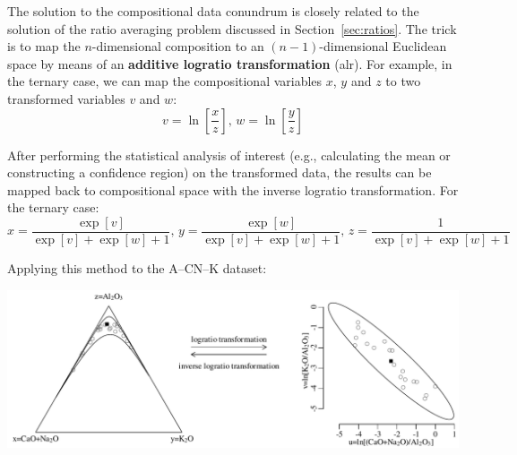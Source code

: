 The solution to the compositional data conundrum is closely related to
the solution of the ratio averaging problem discussed in
Section~\ref{sec:ratios}. The trick is to map the $n$-dimensional
composition to an $(n-1)$-dimensional Euclidean space by means of an
\textbf{additive logratio transformation} (alr). For example, in the
ternary case, we can map the compositional variables $x$, $y$ and $z$
to two transformed variables $v$ and $w$:
\begin{equation}
  v = \ln\!\left[\frac{x}{z}\right] \mbox{,~} w =
  \ln\!\left[\frac{y}{z}\right]
  \label{eq:alr}
\end{equation}

After performing the statistical analysis of interest (e.g.,
calculating the mean or constructing a confidence region) on the
transformed data, the results can be mapped back to compositional
space with the inverse logratio transformation. For the ternary case:
\begin{equation}
  x = \frac{\exp[v]}{\exp[v] + \exp[w] + 1} \mbox{,~}
  y = \frac{\exp[w]}{\exp[v] + \exp[w] + 1} \mbox{,~}
  z = \frac{1}{\exp[v] + \exp[w] + 1}
  \label{eq:inverse-logratio-transformation}
\end{equation}

Applying this method to the A--CN--K dataset:\medskip

\noindent\includegraphics[]{../figures/alr.PDF}
\begingroup {}
\label{fig:alr}\endgroup

